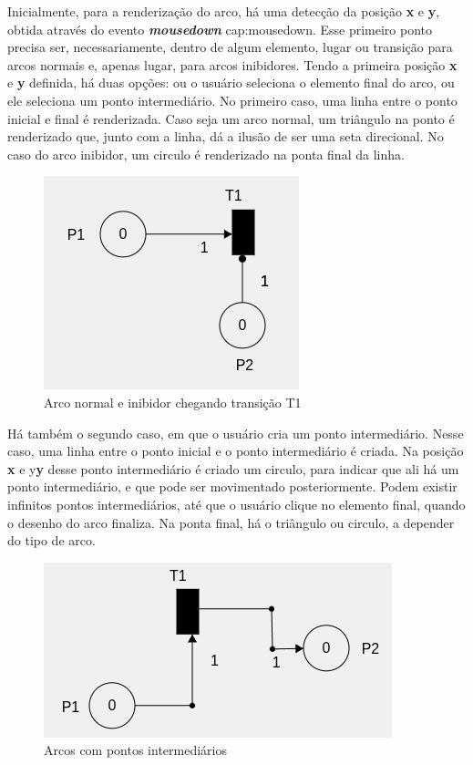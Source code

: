 \documentclass[
	12pt,				%
	openright,			%
	oneside,			%
	a4paper,			%
	english,			%
	brazil				%
	]{abntex2}
\begin{document}


Inicialmente, para a renderização do arco, há uma detecção da posição \textbf{x} e \textbf{y}, obtida através do evento \textbf{\textit{mousedown}} cap:mousedown. Esse primeiro ponto precisa ser, necessariamente, dentro de algum elemento, lugar ou transição para arcos normais e, apenas lugar, para arcos inibidores. Tendo a primeira posição \textbf{x} e \textbf{y} definida, há duas opções: ou o usuário seleciona o elemento final do arco, ou ele seleciona um ponto intermediário. No primeiro caso, uma linha entre o ponto inicial e final é renderizada. Caso seja um arco normal, um triângulo na ponto é renderizado que, junto com a linha, dá a ilusão de ser uma seta direcional. No caso do arco inibidor, um circulo é renderizado na ponta final da linha. 

\begin{figure}[ht] 
	\centering
	\includegraphics[scale=0.7]{figuras/arcNormalInibidor.png}
	\caption[Arco normal e inibidor]{Arco normal e inibidor chegando transição T1}
	\label{fig:arcNormalInibidor}
\end{figure}

Há também o segundo caso, em que o usuário cria um ponto intermediário. Nesse caso, uma linha entre o ponto inicial e o ponto intermediário é criada. Na posição \textbf{x} e y\textbf{y} desse ponto intermediário é criado um circulo, para indicar que ali há um ponto intermediário, e que pode ser movimentado posteriormente. Podem existir infinitos pontos intermediários, até que o usuário clique no elemento final, quando o desenho do arco finaliza. Na ponta final, há o triângulo ou circulo, a depender do tipo de arco. 

\begin{figure}[ht] 
	\centering
	\includegraphics[scale=0.8]{figuras/arcPontoIntermediario.png}
	\caption[Arco com pontos intermediários]{Arcos com pontos intermediários}
	\label{fig:arcPontoIntermediario}
\end{figure}
\end{document}
